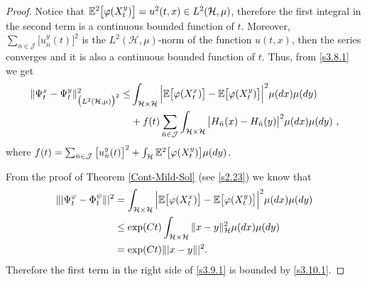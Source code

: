 \documentclass[review,onefignum,onetabnum]{siamart190516}
\begin{document}
\begin{proof}
            Notice that
        $\mathbb{E}^2\big[\varphi(X_t^y)\big]=u^2(t,x)\in L^2(\mathcal{H},\mu)$,
        therefore the first integral in the second term is a continuous bounded
        function of $t$. Moreover,
        $\sum_{\bar n\in \mathcal{J}} \big[u_{\bar n}^y(t)\big]^2$ is the
        $L^2(\mathcal{H},\mu)$-norm of the function $u(t,x)$, then the series
        converges and it is also a continuous bounded function of $t$. Thus, 
        from
        \eqref{s3.8.1} we get
        \begin{equation}
        \label{s3.9.1}
            \begin{aligned}
                \| \Psi_t^x-\Psi_t^y\|_{\big(L^2(\mathcal{H},\mu) \big)^2}^2
                \le&
                \int_{\mathcal{H}\times \mathcal{H}}
                    \Big|
                        \E\big [
                            \varphi(X_t^x)
                        \big
                        ]-
                        \E\big[
                            \varphi(X_t^y)
                        \big]
                    \Big|^2
                \mu(dx)\mu(dy)
                \\
                 &+
                 f(t)
                 \sum_{\bar n\in \mathcal{J}}
                 \int_{\mathcal{H}\times \mathcal{H}}
                    \big|
                        H_{\bar n}(x) - H_{\bar n}(y)
                    \big|^2 \mu(dx)\mu(dy) \ ,
            \end{aligned}
        \end{equation}
        where $f(t)= \sum_{\bar n\in \mathcal{J}} \big[u_{\bar n}^y(t)\big]^2+ 
        \int_\mathcal{H}
                    \mathbb{E} ^ 2\big[
                        \varphi(X_t^y)
                    \big] \mu(dy)
                    $.
        
        From the proof of Theorem \ref{Cont-Mild-Sol} (see \eqref{s2.23}) we 
        know that
        \begin{equation}
            \begin{aligned}
                \| | \Psi_t^\varphi-\Phi_t^\psi\| |^2
                    &=\int_{\mathcal{H}\times \mathcal{H}}
                    \Big|
                        \E\big [
                            \varphi(X_t^x)
                        \big]
                        -
                        \E\big[
                            \varphi(X_t^y)
                        \big]
                    \Big|^2
                    \mu(dx)
                    \mu(dy)
                    \\
                    &\le
                    \exp(Ct)
                    \int_{\mathcal{H}\times \mathcal{H}}
                        \|x-y\|_{\mathcal{H}}^2
                        \mu(dx)\mu(dy)
                    \\
                    &= \exp(Ct) \|  |x-y\| |^2.\label{s3.10.1}
            \end{aligned}
        \end{equation}
        Therefore the first term in the right side of \eqref{s3.9.1} is bounded 
        by
        \eqref{s3.10.1}.
        

\end{proof}
\end{document}
